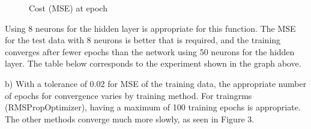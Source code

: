 \documentclass[11pt]{article}
\begin{document}
\begin{enumerate}
\begin{figure}[h!]
\begin{minipage}{0.45\textwidth}
        \caption{Cost (MSE) at epoch}
    \end{minipage}
\end{figure}\newline
Using 8 neurons for the hidden layer is appropriate for this function. The MSE for the test data with 8 neurons is better that is required, and the training converges after fewer epochs than the network using 50 neurons for the hidden layer.\newline
\newline
The table below corresponds to the experiment shown in the graph above.\newline



b) With a tolerance of 0.02 for MSE of the training data, the appropriate number of epochs for convergence varies by training method. For traingrms (RMSPropOptimizer), having a maximum of 100 training epochs is appropriate. The other methods converge much more slowly, as seen in Figure 3. \newline


\end{enumerate}
\end{document}
